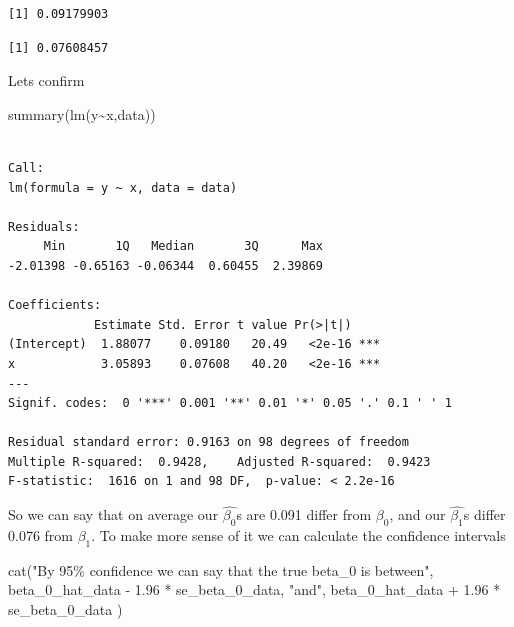 \documentclass[
  letterpaper,
  DIV=11,
  numbers=noendperiod]{scrreprt}
\newenvironment{Shaded}{\begin{snugshade}}{\end{snugshade}}
\newcommand{\DecValTok}[1]{\textcolor[rgb]{0.68,0.00,0.00}{#1}}
\newcommand{\FloatTok}[1]{\textcolor[rgb]{0.68,0.00,0.00}{#1}}
\newcommand{\FunctionTok}[1]{\textcolor[rgb]{0.28,0.35,0.67}{#1}}
\newcommand{\NormalTok}[1]{\textcolor[rgb]{0.00,0.23,0.31}{#1}}
\newcommand{\OtherTok}[1]{\textcolor[rgb]{0.00,0.23,0.31}{#1}}
\newcommand{\SpecialCharTok}[1]{\textcolor[rgb]{0.37,0.37,0.37}{#1}}
\newcommand{\StringTok}[1]{\textcolor[rgb]{0.13,0.47,0.30}{#1}}
\begin{document}
\begin{verbatim}
[1] 0.09179903
\end{verbatim}

\begin{Shaded}
\end{Shaded}

\begin{verbatim}
[1] 0.07608457
\end{verbatim}

Lets confirm

\begin{Shaded}
\begin{Highlighting}[]
\FunctionTok{summary}\NormalTok{(}\FunctionTok{lm}\NormalTok{(y}\SpecialCharTok{\textasciitilde{}}\NormalTok{x,data))}
\end{Highlighting}
\end{Shaded}

\begin{verbatim}

Call:
lm(formula = y ~ x, data = data)

Residuals:
     Min       1Q   Median       3Q      Max 
-2.01398 -0.65163 -0.06344  0.60455  2.39869 

Coefficients:
            Estimate Std. Error t value Pr(>|t|)    
(Intercept)  1.88077    0.09180   20.49   <2e-16 ***
x            3.05893    0.07608   40.20   <2e-16 ***
---
Signif. codes:  0 '***' 0.001 '**' 0.01 '*' 0.05 '.' 0.1 ' ' 1

Residual standard error: 0.9163 on 98 degrees of freedom
Multiple R-squared:  0.9428,    Adjusted R-squared:  0.9423 
F-statistic:  1616 on 1 and 98 DF,  p-value: < 2.2e-16
\end{verbatim}

So we can say that on average our \(\hat{\beta_0}\)s are 0.091 differ
from \(\beta_0\), and our \(\hat{\beta_1}\)s differ 0.076 from
\(\beta_1\). To make more sense of it we can calculate the confidence
intervals

\begin{Shaded}
\begin{Highlighting}[]
\FunctionTok{cat}\NormalTok{(}\StringTok{"By 95\% confidence we can say that the true beta\_0 is between"}\NormalTok{, beta\_0\_hat\_data }\SpecialCharTok{{-}} \FloatTok{1.96} \SpecialCharTok{*}\NormalTok{ se\_beta\_0\_data, }\StringTok{"and"}\NormalTok{, beta\_0\_hat\_data }\SpecialCharTok{+} \FloatTok{1.96} \SpecialCharTok{*}\NormalTok{ se\_beta\_0\_data )}
\end{Highlighting}
\end{Shaded}
\end{document}

